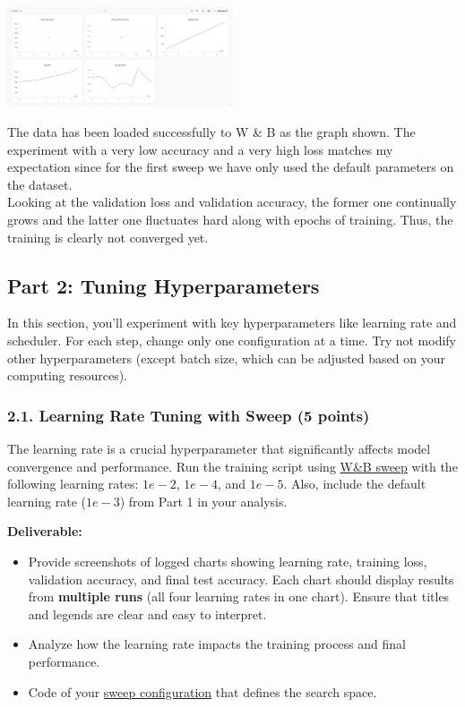 \documentclass[11pt, oneside]{article}   	%
\begin{document}
\begin{center}
    \includegraphics[width=0.5\textwidth]{p1p1_pic/Logged_Charts.png}
\end{center}

The data has been loaded successfully to W \& B as the graph shown. 
The experiment with a very low accuracy and a very high loss matches my expectation since for the first sweep we have only used the default parameters on the dataset.
\\
Looking at the validation loss and validation accuracy, the former one continually grows and the latter one fluctuates hard along with epochs of training. Thus, the training is clearly not converged yet.

\subsection*{Part 2: Tuning Hyperparameters}
In this section, you'll experiment with key hyperparameters like learning rate and scheduler. For each step, change only one configuration at a time. Try not modify other hyperparameters (except batch size, which can be adjusted based on your computing resources).

\subsubsection*{2.1. Learning Rate Tuning with Sweep (5 points)}
 The learning rate is a crucial hyperparameter that significantly affects model convergence and performance.  Run the training script using \href{https://docs.wandb.ai/guides/sweeps/walkthrough}{W\&B sweep} with the following learning rates: $1e-2$, $1e-4$, and $1e-5$. Also, include the default learning rate ($1e-3$) from Part 1 in your analysis.

\noindent\textbf{Deliverable:}
\begin{itemize}
    \item Provide screenshots of logged charts showing learning rate, training loss, validation accuracy, and final test accuracy. Each chart should display results from \textbf{multiple runs} (all four learning rates in one chart). Ensure that titles and legends are clear and easy to interpret.
    \item Analyze how the learning rate impacts the training process and final performance.
    \item Code of your \href{https://docs.wandb.ai/guides/sweeps/define-sweep-configuration}{sweep configuration} that defines the search space.
\end{itemize}
\end{document}
